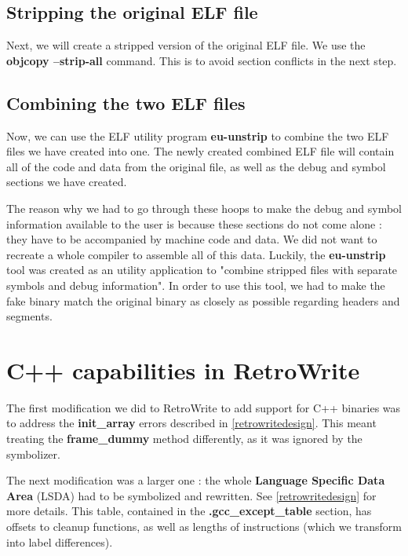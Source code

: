 \documentclass[a4paper,11pt,oneside]{report}
\begin{document}
\subsection{Stripping the original ELF file}

Next, we will create a stripped version of the original ELF file.
We use the \textbf{objcopy --strip-all} command.
This is to avoid section conflicts in the next step.

\subsection{Combining the two ELF files}
\label{combiningelf}

Now, we can use the ELF utility program \textbf{eu-unstrip} to combine the two 
ELF files we have created into one.
The newly created combined ELF file will contain all of the code and data from 
the original file, as well as the debug and symbol sections we have created.

The reason why we had to go through these hoops to make the debug and symbol
information available to the user is because these sections do not come alone
: they have to be accompanied by machine code and data.
We did not want to recreate a whole compiler to assemble all of this data.
Luckily, the \textbf{eu-unstrip} tool was created as an utility application
to "combine stripped files with separate symbols and debug information".
In order to use this tool, we had to make the fake binary match the original
binary as closely as possible regarding headers and segments.


\section{C++ capabilities in RetroWrite}
\label{retrowriteimplementation}

The first modification we did to RetroWrite to add support for C++ binaries
was to address the \textbf{init\_array} errors described in
\autoref{retrowritedesign}.
This meant treating the \textbf{frame\_dummy} method differently, as it was
ignored by the symbolizer.

The next modification was a larger one : the whole \textbf{Language Specific
Data Area} (LSDA) had to be symbolized and rewritten.
See \autoref{retrowritedesign} for more details.
This table, contained in the \textbf{.gcc\_except\_table} section, has offsets
to cleanup functions, as well as lengths of instructions (which we transform
into label differences).
\end{document}
